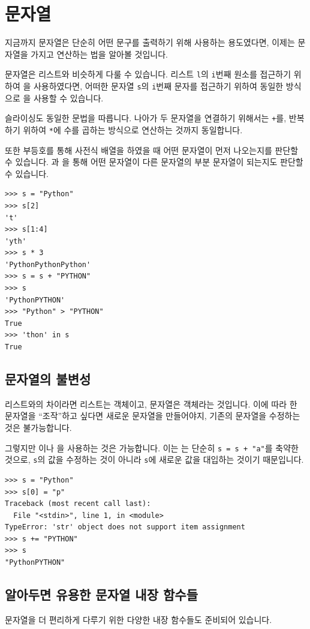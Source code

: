 \documentclass[../main.tex]{subfiles}
\begin{document}
\section{문자열}
지금까지 문자열은 단순히 어떤 문구를 출력하기 위해 사용하는 용도였다면, 이제는 문자열을 가지고 연산하는 법을 알아볼 것입니다.

문자열은 리스트와 비슷하게 다룰 수 있습니다.
리스트 \texttt{l}의 \texttt{i}번째 원소를 접근하기 위하여 을 사용하였다면, 어떠한 문자열 \texttt{s}의 \texttt{i}번째 문자를 접근하기 위하여 동일한 방식으로 을 사용할 수 있습니다.

슬라이싱도 동일한 문법을 따릅니다.
나아가 두 문자열을 연결하기 위해서는 \texttt{+}를, 반복하기 위하여 \texttt{*}에 수를 곱하는 방식으로 연산하는 것까지 동일합니다.

또한 부등호를 통해 사전식 배열을 하였을 때 어떤 문자열이 먼저 나오는지를 판단할 수 있습니다.
과 을 통해 어떤 문자열이 다른 문자열의 부분 문자열이 되는지도 판단할 수 있습니다.
\begin{verbatim}
>>> s = "Python"
>>> s[2]
't'
>>> s[1:4]
'yth'
>>> s * 3
'PythonPythonPython'
>>> s = s + "PYTHON"
>>> s
'PythonPYTHON'
>>> "Python" > "PYTHON"
True
>>> 'thon' in s
True
\end{verbatim}

\subsection{문자열의 불변성}
리스트와의 차이라면 리스트는  객체이고, 문자열은  객체라는 것입니다.
이에 따라 한 문자열을 ``조작''하고 싶다면 새로운 문자열을 만들어야지, 기존의 문자열을 수정하는 것은 불가능합니다.

그렇지만 \pyin{+=}이나 \pyin{*=}을 사용하는 것은 가능합니다.
이는 는 단순히 \texttt{s = s + "a"}를 축약한 것으로, \verb/s/의 값을 수정하는 것이 아니라 \verb/s/에 새로운 값을 대입하는 것이기 때문입니다.
\begin{verbatim}
>>> s = "Python"
>>> s[0] = "p"
Traceback (most recent call last):
  File "<stdin>", line 1, in <module>
TypeError: 'str' object does not support item assignment
>>> s += "PYTHON"
>>> s
"PythonPYTHON"
\end{verbatim}

\subsection{알아두면 유용한 문자열 내장 함수들}
문자열을 더 편리하게 다루기 위한 다양한 내장 함수들도 준비되어 있습니다.
\end{document}
